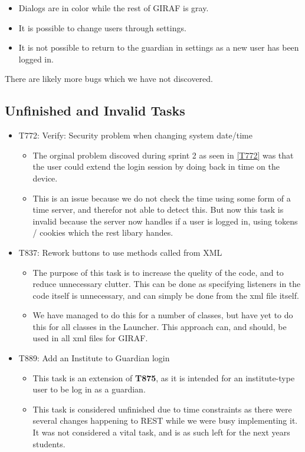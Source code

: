 \begin{itemize}
  \item Dialogs are in color while the rest of GIRAF is gray.
  \item It is possible to change users through settings.
  \item It is not possible to return to the guardian in settings as a new user
  has been logged in.
\end{itemize}

There are likely more bugs which we have not discovered.


\subsection{Unfinished and Invalid Tasks}\label{S4Invalid}
\begin{itemize}
  \item T772: Verify: Security problem when changing system date/time
  	\begin{itemize}
  		\item The orginal problem discoved during sprint 2 as seen in \autoref{T772}
 		was that the user could extend the login session by doing back in time on the
  		device.
		\item This is an issue because we do not check the time using some form of a
		time server, and therefor not able to detect this.  
		But now this task is invalid because the server now handles if a user is
		logged in, using tokens / cookies which the rest libary handes.
		\end{itemize}
  \item T837: Rework buttons to use methods called from XML
	\begin{itemize}
	  \item The purpose of this task is to increase the quelity of the code, and to
	  reduce unnecessary clutter. This can be done as specifying listeners in the
	  code itself is unnecessary, and can simply be done from the xml file itself.
	  \item We have managed to do this for a number of classes, but have yet to
	  do this for all classes in the Launcher. This approach can, and should, be
	  used in all xml files for GIRAF.
	  \end{itemize}
  \item T889: Add an Institute to Guardian login
   \begin{itemize}
     \item This task is an extension of \textbf{T875}, as it is intended for an
     institute-type user to be log in as a guardian. 
     \item This task is considered unfinished due to time constraints as there
     were several changes happening to REST while we were busy implementing it.
     It was not considered a vital task, and is as such left for the next years
     students.
   \end{itemize}
\end{itemize}
